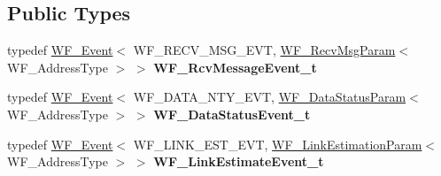 \subsection*{Public Types}
\begin{DoxyCompactItemize}
\item 
typedef \hyperlink{class_waveform_1_1_w_f___event}{W\+F\+\_\+\+Event}$<$ W\+F\+\_\+\+R\+E\+C\+V\+\_\+\+M\+S\+G\+\_\+\+E\+VT, \hyperlink{struct_waveform_1_1_w_f___recv_msg_param}{W\+F\+\_\+\+Recv\+Msg\+Param}$<$ W\+F\+\_\+\+Address\+Type $>$ $>$ {\bfseries W\+F\+\_\+\+Rcv\+Message\+Event\+\_\+t}\hypertarget{class_waveform_1_1_waveform___i_ac3fb531925a9157639bf197fee7e8418}{}\label{class_waveform_1_1_waveform___i_ac3fb531925a9157639bf197fee7e8418}

\item 
typedef \hyperlink{class_waveform_1_1_w_f___event}{W\+F\+\_\+\+Event}$<$ W\+F\+\_\+\+D\+A\+T\+A\+\_\+\+N\+T\+Y\+\_\+\+E\+VT, \hyperlink{struct_waveform_1_1_w_f___data_status_param}{W\+F\+\_\+\+Data\+Status\+Param}$<$ W\+F\+\_\+\+Address\+Type $>$ $>$ {\bfseries W\+F\+\_\+\+Data\+Status\+Event\+\_\+t}\hypertarget{class_waveform_1_1_waveform___i_a5efbb2428b3d0dbe51994f70a352a1ba}{}\label{class_waveform_1_1_waveform___i_a5efbb2428b3d0dbe51994f70a352a1ba}

\item 
typedef \hyperlink{class_waveform_1_1_w_f___event}{W\+F\+\_\+\+Event}$<$ W\+F\+\_\+\+L\+I\+N\+K\+\_\+\+E\+S\+T\+\_\+\+E\+VT, \hyperlink{struct_core_1_1_w_f___link_estimation_param}{W\+F\+\_\+\+Link\+Estimation\+Param}$<$ W\+F\+\_\+\+Address\+Type $>$ $>$ {\bfseries W\+F\+\_\+\+Link\+Estimate\+Event\+\_\+t}\hypertarget{class_waveform_1_1_waveform___i_a90a5d0b20f5e152b91d3e9701c9db069}{}\label{class_waveform_1_1_waveform___i_a90a5d0b20f5e152b91d3e9701c9db069}

\end{DoxyCompactItemize}
